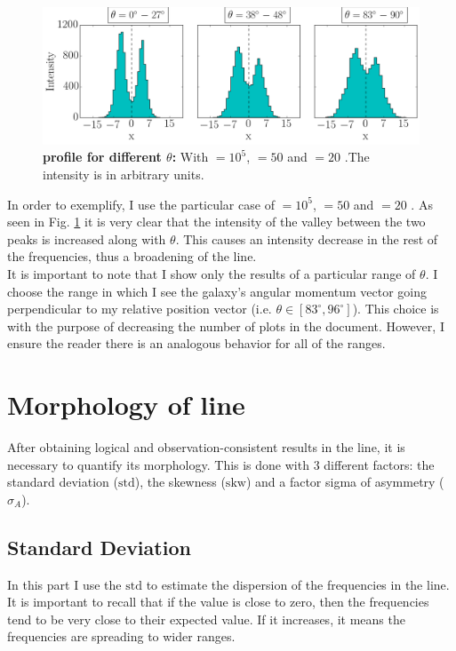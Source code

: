 \begin{figure}[h!]
	\begin{center}
		\includegraphics[width=1\textwidth]{./figures/chapter3/influence_viewing_angle2}
	\end{center}
	\caption{\textbf{\lya profile for different $\theta$:} With \tauh$=10^5$, \vrot$=50$ \kms and \vout$=20$ \kms.The intensity is in arbitrary units.
		\label{fig:influence_viewing_angle}}
\end{figure}

In order to exemplify, I use the particular case of \tauh$=10^5$, \vrot$=50$ \kms and \vout$=20$ \kms. As seen in Fig. \ref{fig:influence_viewing_angle} it is very clear that the intensity of the valley between the two peaks is increased along with $\theta$. This causes an intensity decrease in the rest of the frequencies, thus a broadening of the line. \\

It is important to note that I show only the results of a particular range of $\theta$. I choose the range in which I see the galaxy's angular momentum vector going perpendicular to my relative position vector (i.e. $\theta \in [83^\circ,96^\circ]$). This choice is with the purpose of decreasing the number of plots in the document. However, I ensure the reader there is an analogous behavior for all of the ranges. \\

\section{Morphology of \lya line}
After obtaining logical and observation-consistent results in the \lya line, it is necessary to quantify its morphology. This is done with 3 different factors: the standard deviation ($\mathrm{std}$), the skewness ($\mathrm{skw}$) and a factor sigma of asymmetry ($\sigma_A$). \\

\subsection{Standard Deviation}
In this part I use the $\mathrm{std}$ to estimate the dispersion of the frequencies in the \lya line. It is important to recall that if the value is close to zero, then the frequencies tend to be very close to their expected value. If it increases, it means the frequencies are spreading to wider ranges. \\

